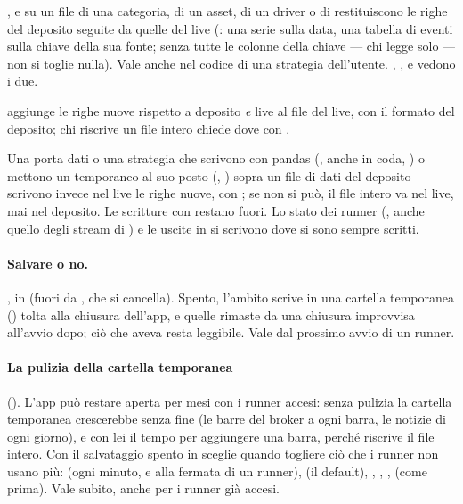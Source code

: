 \begin{description}[leftmargin = 1.4em, style = nextline, itemsep = 4pt]
  \item[Si legge l'unione] ,  e
     su un file di una categoria, di un asset, di un
    driver o di  restituiscono le righe del deposito seguite da
    quelle del live (: una serie sulla data, una tabella
    di eventi sulla chiave della sua fonte; senza tutte le colonne della
    chiave --- chi legge solo  --- non si toglie nulla). Vale anche
    nel codice di una strategia dell'utente. ,
    ,  e  vedono i due.
  \item[Si scrive nel live]  aggiunge le
    righe nuove rispetto a deposito \emph{e} live al file del live, con il
    formato del deposito; chi riscrive un file intero chiede dove con
    .
  \item[Le scritture dirette si intercettano] Una porta dati o una strategia
    che scrivono con pandas (,  anche in coda,
    ) o mettono un temporaneo al suo posto
    (, ) sopra un file di dati del deposito
    scrivono invece nel live le righe nuove, con ; se non si
    può, il file intero va nel live, mai nel deposito. Le scritture con
     restano fuori. Lo stato dei runner (,
    anche quello degli stream di ) e le uscite in
     si scrivono dove si sono sempre scritti.
\end{description}

\paragraph{Salvare o no.} ,
in  (fuori da , che si cancella).
Spento, l'ambito scrive in una cartella temporanea
() tolta alla chiusura dell'app, e quelle
rimaste da una chiusura improvvisa all'avvio dopo; ciò che 
aveva resta leggibile. Vale dal prossimo avvio di un runner.

\paragraph{La pulizia della cartella temporanea} ().
L'app può restare aperta per mesi con i runner accesi: senza pulizia la
cartella temporanea crescerebbe senza fine (le barre del broker a ogni barra,
le notizie di ogni giorno), e con lei il tempo per aggiungere una barra,
perché  riscrive il file intero. Con il salvataggio spento
 in  sceglie quando togliere ciò che
i runner non usano più:  (ogni minuto, e alla fermata di un
runner),  (il default), , , , 
(come prima). Vale subito, anche per i runner già accesi.


